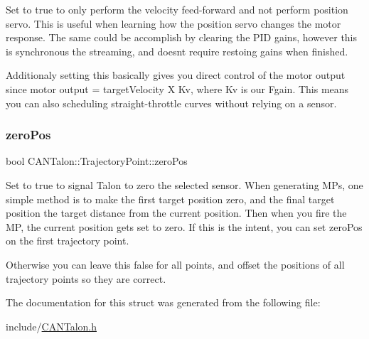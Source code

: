 Set to true to only perform the velocity feed-\/forward and not perform position servo. This is useful when learning how the position servo changes the motor response. The same could be accomplish by clearing the P\+ID gains, however this is synchronous the streaming, and doesn\textquotesingle{}t require restoing gains when finished.

Additionaly setting this basically gives you direct control of the motor output since motor output = target\+Velocity X Kv, where Kv is our Fgain. This means you can also scheduling straight-\/throttle curves without relying on a sensor. \mbox{\label{struct_c_a_n_talon_1_1_trajectory_point_ad0f0243fe8d9eaa28d0eeee1026e235e}} 
\subsubsection{\texorpdfstring{zero\+Pos}{zeroPos}}
{\footnotesize\ttfamily bool C\+A\+N\+Talon\+::\+Trajectory\+Point\+::zero\+Pos}

Set to true to signal Talon to zero the selected sensor. When generating M\+Ps, one simple method is to make the first target position zero, and the final target position the target distance from the current position. Then when you fire the MP, the current position gets set to zero. If this is the intent, you can set zero\+Pos on the first trajectory point.

Otherwise you can leave this false for all points, and offset the positions of all trajectory points so they are correct. 

The documentation for this struct was generated from the following file\+:\begin{DoxyCompactItemize}
\item 
include/\hyperlink{_c_a_n_talon_8h}{C\+A\+N\+Talon.\+h}\end{DoxyCompactItemize}
